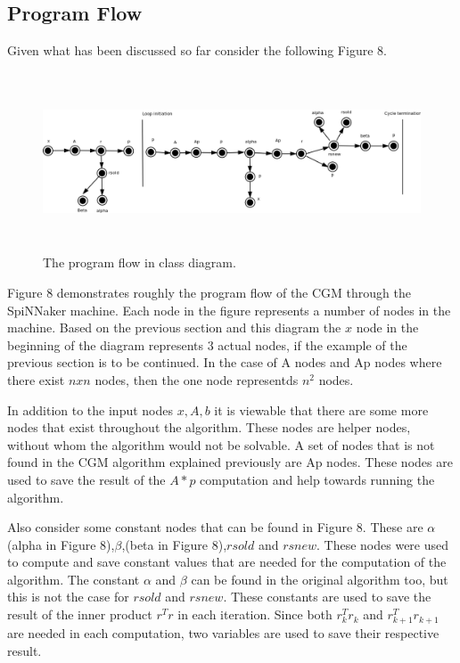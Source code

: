 \documentclass[12pt,a4paper]{article}
\begin{document}
\subsection{Program Flow}
Given what has been discussed so far consider the following Figure 8.
\begin{figure}[h!]
\includegraphics[width=500pt,height=150pt,scale=1]{Pics/program_flow.png}
\centering
\caption{The program flow in class diagram.}
\end{figure}
Figure 8 demonstrates roughly the program flow of the CGM through the SpiNNaker machine. Each node in the figure represents a number of nodes in the machine. Based on the previous section and this diagram the $x$ node in the beginning of the diagram represents 3 actual nodes, if the example of the previous section is to be continued. In the case of A nodes and Ap nodes where there exist $nxn$ nodes, then the one node representds $n^2$ nodes. 

In addition to the input nodes $x,A,b$ it is viewable that there are some more nodes that exist throughout the algorithm. These nodes are helper nodes, without whom the algorithm would not be solvable. A set of nodes that is not found in the CGM algorithm explained previously are Ap nodes. These nodes are used to save the result of the $A*p$ computation and help towards running the algorithm.

Also consider some constant nodes that can be found in Figure 8. These are $\alpha$(alpha in Figure 8),$\beta$,(beta in Figure 8),$rsold$ and $rsnew$. These nodes were used to compute and save constant values that are needed for the computation of the algorithm. The constant $\alpha$ and $\beta$ can be found in the original algorithm too, but this is not the case for $rsold$ and $rsnew$. These constants are used to save the result of the inner product $r^Tr$ in each iteration. Since both $r_k^Tr_k$ and $r_{k+1}^Tr_{k+1}$ are needed in each computation, two variables are used to save their respective result.
\end{document}
